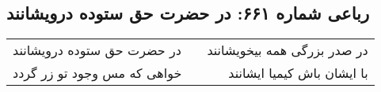 \begin{center}
\section*{رباعی شماره ۶۶۱: در حضرت حق ستوده درویشانند}
\label{sec:0661}
\begin{longtable}{l p{0.5cm} r}
در حضرت حق ستوده درویشانند
&&
در صدر بزرگی همه بیخویشانند
\\
خواهی که مس وجود تو زر گردد
&&
با ایشان باش کیمیا ایشانند
\\
\end{longtable}
\end{center}
